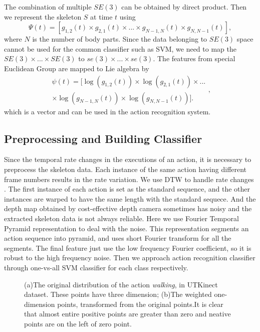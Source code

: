 \documentclass[conference]{IEEEtran}
\begin{document}
		The combination of multiple $ SE(3) $ can be obtained by direct product.
		Then we represent the skeleton $ S $ at time $ t $ using
		\begin{equation}
			\Psi(t)=[g_{1,2}(t)\times g_{2,1}(t)\times ...\times g_{N-1,N}(t)\times g_{N,N-1}(t)],
		\end{equation}
		where $ N $ is the number of body parts.
		Since the data belonging to $ SE(3) $ space cannot be used for the common classifier such as SVM, we need to map the $ SE(3)\times...\times SE(3) $ to $ se(3)\times...\times se(3) $.
		The features from special Euclidean Group are mapped to Lie algebra by
		\begin{equation}
			\begin{array}{r}
				\psi(t)=[\log(g_{1,2}(t))\times \log(g_{2,1}(t))\times ... \\
				\times\log(g_{N-1,N}(t))\times\log(g_{N,N-1}(t))].
			\end{array},
		\end{equation}
		which is a vector and can be used in the action recognition system.
		
	\subsection{Preprocessing and Building Classifier}
		Since the temporal rate changes in the executions of an action, it is necessary to preprocess the skeleton data.
		Each instance of the same action having different frame numbers results in the rate variation.
		We use DTW to handle rate changes \cite{Rate_invariant}.
		The first instance of each action is set as the standard sequence, and the other instances are warped to have the same length with the standard sequece.
		And the depth map obtained by cost-effective depth camera sometimes has noisy and the extracted skeleton data is not always reliable.
		Here we use Fourier Temporal Pyramid representation \cite{fourier_temporal_pyramid} to deal with the noise.
		This representation segments an action sequence into pyramid, and uses short Fourier transform for all the segments.
		The final feature just use the low frequency Fourier coefficient, so it is robust to the high frequency noise.
		Then we approach action recognition classifier through one-vs-all SVM classifier \cite{prml} for each class respectively.

		\begin{figure}[h]
			\centering
			\vfill
			\centering
			\caption{(a)The original distribution of the action \textit{walking}, in UTKinect dataset. These points have three dimension; (b)The weighted one-dimension points, transformed from the original points.It is clear that almost entire positive points are greater than zero and neative points are on the left of zero point.}
		\end{figure}
\end{document}
